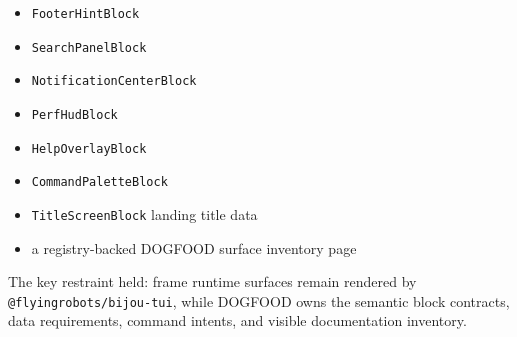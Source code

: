 \begin{itemize}
\tightlist
\item
  \texttt{F\allowbreak{}o\allowbreak{}o\allowbreak{}t\allowbreak{}e\allowbreak{}r\allowbreak{}H\allowbreak{}i\allowbreak{}n\allowbreak{}t\allowbreak{}B\allowbreak{}l\allowbreak{}o\allowbreak{}c\allowbreak{}k}
\item
  \texttt{S\allowbreak{}e\allowbreak{}a\allowbreak{}r\allowbreak{}c\allowbreak{}h\allowbreak{}P\allowbreak{}a\allowbreak{}n\allowbreak{}e\allowbreak{}l\allowbreak{}B\allowbreak{}l\allowbreak{}o\allowbreak{}c\allowbreak{}k}
\item
  \texttt{N\allowbreak{}o\allowbreak{}t\allowbreak{}i\allowbreak{}f\allowbreak{}i\allowbreak{}c\allowbreak{}a\allowbreak{}t\allowbreak{}i\allowbreak{}o\allowbreak{}n\allowbreak{}C\allowbreak{}e\allowbreak{}n\allowbreak{}t\allowbreak{}e\allowbreak{}r\allowbreak{}B\allowbreak{}l\allowbreak{}o\allowbreak{}c\allowbreak{}k}
\item
  \texttt{P\allowbreak{}e\allowbreak{}r\allowbreak{}f\allowbreak{}H\allowbreak{}u\allowbreak{}d\allowbreak{}B\allowbreak{}l\allowbreak{}o\allowbreak{}c\allowbreak{}k}
\item
  \texttt{H\allowbreak{}e\allowbreak{}l\allowbreak{}p\allowbreak{}O\allowbreak{}v\allowbreak{}e\allowbreak{}r\allowbreak{}l\allowbreak{}a\allowbreak{}y\allowbreak{}B\allowbreak{}l\allowbreak{}o\allowbreak{}c\allowbreak{}k}
\item
  \texttt{C\allowbreak{}o\allowbreak{}m\allowbreak{}m\allowbreak{}a\allowbreak{}n\allowbreak{}d\allowbreak{}P\allowbreak{}a\allowbreak{}l\allowbreak{}e\allowbreak{}t\allowbreak{}t\allowbreak{}e\allowbreak{}B\allowbreak{}l\allowbreak{}o\allowbreak{}c\allowbreak{}k}
\item
  \texttt{T\allowbreak{}i\allowbreak{}t\allowbreak{}l\allowbreak{}e\allowbreak{}S\allowbreak{}c\allowbreak{}r\allowbreak{}e\allowbreak{}e\allowbreak{}n\allowbreak{}B\allowbreak{}l\allowbreak{}o\allowbreak{}c\allowbreak{}k} landing title data
\item
  a registry-backed DOGFOOD surface inventory page
\end{itemize}

The key restraint held: frame runtime surfaces remain rendered by \texttt{@\allowbreak{}f\allowbreak{}l\allowbreak{}y\allowbreak{}i\allowbreak{}n\allowbreak{}g\allowbreak{}r\allowbreak{}o\allowbreak{}b\allowbreak{}o\allowbreak{}t\allowbreak{}s\allowbreak{}/\allowbreak{}b\allowbreak{}i\allowbreak{}j\allowbreak{}o\allowbreak{}u\allowbreak{}-\allowbreak{}t\allowbreak{}u\allowbreak{}i}, while DOGFOOD owns the semantic block contracts, data requirements, command intents, and visible documentation inventory.

